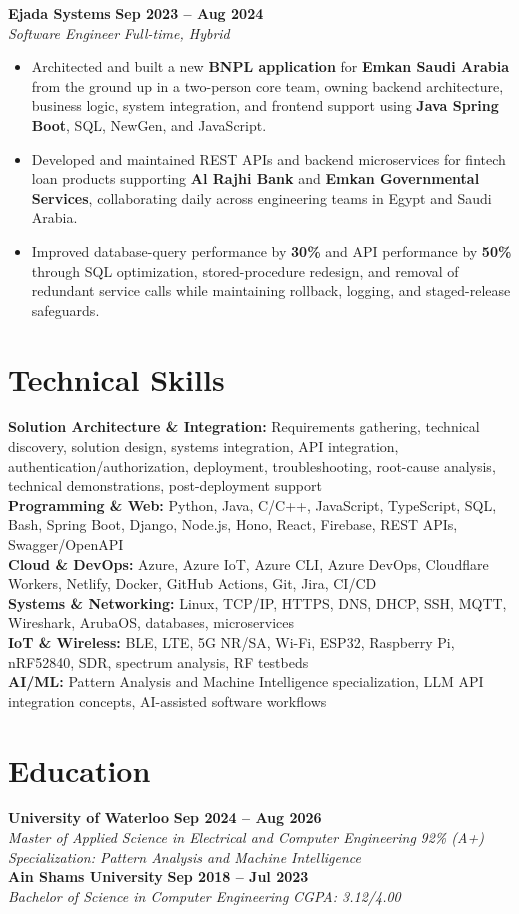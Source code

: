 \documentclass[letterpaper,11pt]{article}
\newcommand{\resumeSubheading}[4]{
  \textbf{#1} \hfill \textbf{#2} \\
  \textit{#3} \hfill \textit{#4} \\
}
\begin{document}
\resumeSubheading
{Ejada Systems}{Sep 2023 -- Aug 2024}
{Software Engineer}{Full-time, Hybrid}
\begin{itemize}
  \item Architected and built a new \textbf{BNPL application} for \textbf{Emkan Saudi Arabia} from the ground up in a two-person core team, owning backend architecture, business logic, system integration, and frontend support using \textbf{Java Spring Boot}, SQL, NewGen, and JavaScript.
  \item Developed and maintained REST APIs and backend microservices for fintech loan products supporting \textbf{Al Rajhi Bank} and \textbf{Emkan Governmental Services}, collaborating daily across engineering teams in Egypt and Saudi Arabia.
  \item Improved database-query performance by \textbf{30\%} and API performance by \textbf{50\%} through SQL optimization, stored-procedure redesign, and removal of redundant service calls while maintaining rollback, logging, and staged-release safeguards.
\end{itemize}

\section{Technical Skills}
\textbf{Solution Architecture \& Integration:} Requirements gathering, technical discovery, solution design, systems integration, API integration, authentication/authorization, deployment, troubleshooting, root-cause analysis, technical demonstrations, post-deployment support \\
\textbf{Programming \& Web:} Python, Java, C/C++, JavaScript, TypeScript, SQL, Bash, Spring Boot, Django, Node.js, Hono, React, Firebase, REST APIs, Swagger/OpenAPI \\
\textbf{Cloud \& DevOps:} Azure, Azure IoT, Azure CLI, Azure DevOps, Cloudflare Workers, Netlify, Docker, GitHub Actions, Git, Jira, CI/CD \\
\textbf{Systems \& Networking:} Linux, TCP/IP, HTTPS, DNS, DHCP, SSH, MQTT, Wireshark, ArubaOS, databases, microservices \\
\textbf{IoT \& Wireless:} BLE, LTE, 5G NR/SA, Wi-Fi, ESP32, Raspberry Pi, nRF52840, SDR, spectrum analysis, RF testbeds \\
\textbf{AI/ML:} Pattern Analysis and Machine Intelligence specialization, LLM API integration concepts, AI-assisted software workflows

\section{Education}
\textbf{University of Waterloo} \hfill \textbf{Sep 2024 -- Aug 2026} \\
\textit{Master of Applied Science in Electrical and Computer Engineering} \hfill \textit{92\% (A+)} \\
\textit{Specialization: Pattern Analysis and Machine Intelligence} \\
\vspace{4pt}
\textbf{Ain Shams University} \hfill \textbf{Sep 2018 -- Jul 2023} \\
\textit{Bachelor of Science in Computer Engineering} \hfill \textit{CGPA: 3.12/4.00}
\end{document}
